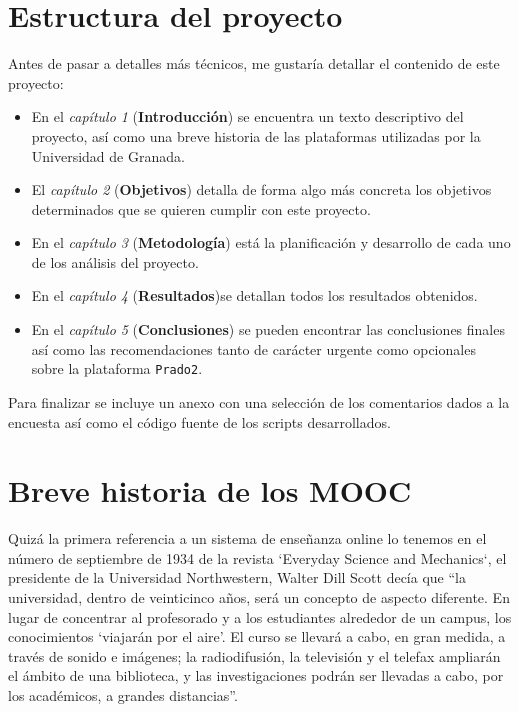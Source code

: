 \section{Estructura del proyecto}


\bigskip
Antes de pasar a detalles más técnicos, me gustaría detallar el contenido de este proyecto:

\begin{itemize}
  \item En el \textit{capítulo 1} (\textbf{Introducción}) se encuentra un texto descriptivo del proyecto, así como una breve historia de las plataformas utilizadas por la Universidad de Granada.
  \item El \textit{capítulo 2} (\textbf{Objetivos}) detalla de forma algo más concreta los objetivos determinados que se quieren cumplir con este proyecto.
  \item En el \textit{capítulo 3} (\textbf{Metodología}) está la planificación y desarrollo de cada uno de los análisis del proyecto.
  \item En el \textit{capítulo 4} (\textbf{Resultados})se detallan todos los resultados obtenidos.
  \item En el \textit{capítulo 5} (\textbf{Conclusiones}) se pueden encontrar las conclusiones finales  así como las recomendaciones tanto de carácter urgente como opcionales sobre la plataforma \texttt{Prado2}.

\end{itemize}


\bigskip
Para finalizar se incluye un anexo con una selección de los comentarios dados a la encuesta así como el código fuente de los scripts desarrollados.

\section{Breve historia de los MOOC}

Quizá la primera referencia a un sistema de enseñanza online lo tenemos en el número de septiembre de 1934 de la revista ‘Everyday Science and Mechanics‘, el presidente de la Universidad Northwestern, Walter Dill Scott decía que ``la universidad, dentro de veinticinco años, será un concepto de aspecto diferente. En lugar de concentrar al profesorado y a los estudiantes alrededor de un campus, los conocimientos ‘viajarán por el aire’. El curso se llevará a cabo, en gran medida, a través de sonido e imágenes; la radiodifusión, la televisión y el telefax ampliarán el ámbito de una biblioteca, y las investigaciones podrán ser llevadas a cabo, por los académicos, a grandes distancias''\cite{art_12}.

